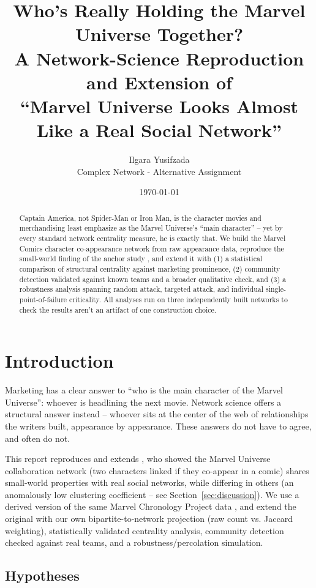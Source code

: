\documentclass[11pt]{article}
\title{Who's Really Holding the Marvel Universe Together?\\
\large A Network-Science Reproduction and Extension of\\
``Marvel Universe Looks Almost Like a Real Social Network''}
\author{Ilgara Yusifzada\\ \small Complex Network - Alternative Assignment}
\date{\today}
\begin{document}
\maketitle

\begin{abstract}
Captain America, not Spider-Man or Iron Man, is the character movies and merchandising least emphasize as the Marvel Universe's ``main character'' -- yet by every standard network centrality measure, he is exactly that. We build the Marvel Comics character co-appearance network from raw appearance data, reproduce the small-world finding of the anchor study \citep{alberich2002marvel}, and extend it with (1) a statistical comparison of structural centrality against marketing prominence, (2) community detection validated against known teams and a broader qualitative check, and (3) a robustness analysis spanning random attack, targeted attack, and individual single-point-of-failure criticality. All analyses run on three independently built networks to check the results aren't an artifact of one construction choice.
\end{abstract}

\section{Introduction}

Marketing has a clear answer to ``who is the main character of the Marvel Universe'': whoever is headlining the next movie. Network science offers a structural answer instead -- whoever sits at the center of the web of relationships the writers built, appearance by appearance. These answers do not have to agree, and often do not.

This report reproduces and extends \citet{alberich2002marvel}, who showed the Marvel Universe collaboration network (two characters linked if they co-appear in a comic) shares small-world properties with real social networks, while differing in others (an anomalously low clustering coefficient -- see Section~\ref{sec:discussion}). We use a derived version of the same Marvel Chronology Project data \citep{walsh2020marvel}, and extend the original with our own bipartite-to-network projection (raw count vs. Jaccard weighting), statistically validated centrality analysis, community detection checked against real teams, and a robustness/percolation simulation.

\subsection{Hypotheses}
\end{document}
